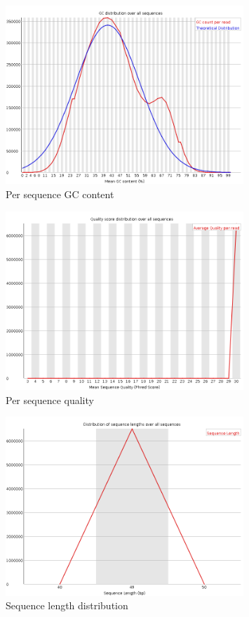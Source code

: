 \documentclass[UTF8]{ctexart}
\begin{document}
\begin{figure}[!htb]
	\centering
	\includegraphics[width=0.8\textwidth]{img/SRR14325859_FastQC_Origin_img/per_sequence_gc_content.png}	
	\caption{Per sequence GC content\protect}    
\end{figure}

\begin{figure}[!htb]
	\centering
	\includegraphics[width=0.8\textwidth]{img/SRR14325859_FastQC_Origin_img/per_sequence_quality.png}	
	\caption{Per sequence quality\protect}    
\end{figure}

\begin{figure}[!htb]
	\centering
	\includegraphics[width=0.8\textwidth]{img/SRR14325859_FastQC_Origin_img/sequence_length_distribution.png}	
	\caption{Sequence length distribution\protect}    
\end{figure}
\end{document}
